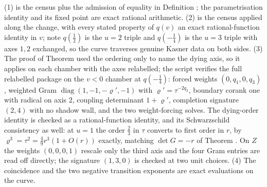 (1) is the census plus the admission of equality in Definition ; the parametrisation identity and its fixed point are exact rational arithmetic. (2) is the census applied along the change, with every stated property of $q(v)$ an exact rational-function identity in $v$; note $q(\tfrac12)$ is the $u=2$ triple and $q(-\tfrac14)$ is the $u=3$ triple with axes $1,2$ exchanged, so the curve traverses genuine Kasner data on both sides. (3) The proof of Theorem  used the ordering only to name the dying axis, so it applies on each chamber with the axes relabelled; the script verifies the full relabelled package on the $v<0$ chamber at $q(-\tfrac14)$: forced weights $(0,q_1,0,q_3)$, weighted Gram $\operatorname{diag}(1,-1,-\varrho',-1)$ with $\varrho' = \tau^{-2q_2}$, boundary corank one with radical on axis $2$, coupling determinant $1+\varrho'$, completion signature $(2,4)$ with no shadow wall, and the two weight-forcing solves. The dying-order identity is checked as a rational-function identity, and its Schwarzschild consistency as well: at $u=1$ the order $\tfrac23$ in $\tau$ converts to first order in $r$, by $\varrho^3 = \tau^2 = \tfrac49 r^3(1 + O(r))$ exactly, matching $\det G = -r$ of Theorem . On $Z$ the weights $(0,0,0,1)$ rescale only the third axis and the four Gram entries are read off directly; the signature $(1,3,0)$ is checked at two unit choices. (4) The coincidence and the two negative transition exponents are exact evaluations on the curve.
